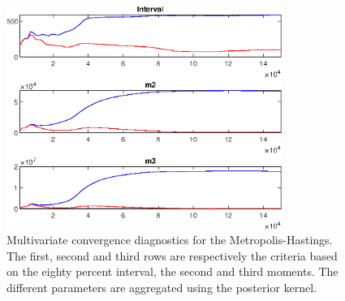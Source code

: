  
\begin{figure}[H]
\centering 
\includegraphics[width=0.8\textwidth]{BRS_sectoral_wo_gmf/Output/BRS_sectoral_wo_gmf_mdiag}
\caption{Multivariate convergence diagnostics for the Metropolis-Hastings.
The first, second and third rows are respectively the criteria based on
the eighty percent interval, the second and third moments. The different 
parameters are aggregated using the posterior kernel.}\label{Fig:MultivariateDiagnostics}
\end{figure}

